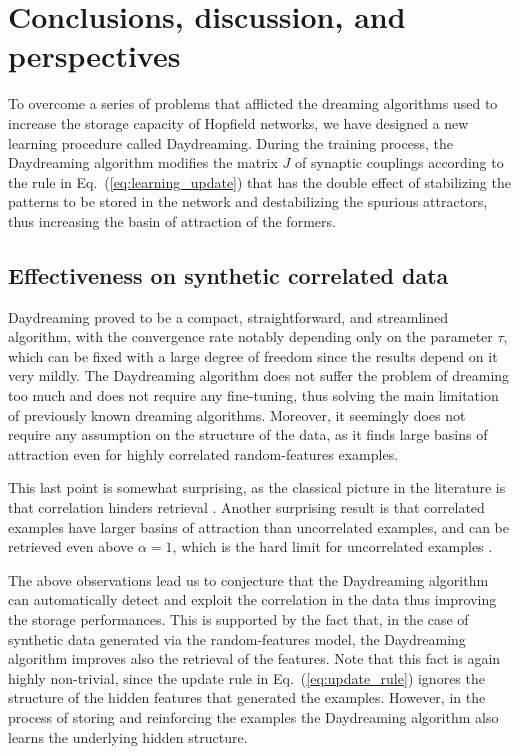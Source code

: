 \documentclass[a4paper]{cas-sc}
\begin{document}
\section{Conclusions, discussion, and perspectives}
\label{sec:conclusions}
To overcome a series of problems that afflicted the dreaming algorithms used to increase the storage capacity of Hopfield networks, we have designed a new learning procedure called Daydreaming.
During the training process, the Daydreaming algorithm modifies the matrix $J$ of synaptic couplings according to the rule in Eq.~(\ref{eq:learning_update}) that has the double effect of stabilizing the patterns to be stored in the network and destabilizing the spurious attractors, thus increasing the basin of attraction of the formers.  

\subsection{Effectiveness on synthetic correlated data}
Daydreaming proved to be a compact, straightforward, and streamlined algorithm, with the convergence rate notably depending only on the parameter $\tau$, which can be fixed with a large degree of freedom since the results depend on it very mildly. The Daydreaming algorithm does not suffer the problem of dreaming too much and does not require any fine-tuning, thus solving the main limitation of previously known dreaming algorithms. Moreover, it seemingly does not require any assumption on the structure of the data, as it finds large basins of attraction even for highly correlated random-features examples. 

This last point is somewhat surprising, as the classical picture in the literature is that correlation hinders retrieval \cite{amit1987information, fontanari1990storage, der1992modified, lowe1998storage, van1997hebbian}. Another surprising result is that correlated examples have larger basins of attraction than uncorrelated examples, and can be retrieved even above $\alpha=1$, which is the hard limit for uncorrelated examples \cite{gardner1988space}. 

The above observations lead us to conjecture that the Daydreaming algorithm can automatically detect and exploit the correlation in the data thus improving the storage performances.
This is supported by the fact that, in the case of synthetic data generated via the random-features model, the Daydreaming algorithm improves also the retrieval of the features.
Note that this fact is again highly non-trivial, since the update rule in Eq.~(\ref{eq:update_rule}) ignores the structure of the hidden features that generated the examples.
However, in the process of storing and reinforcing the examples the Daydreaming algorithm also learns the underlying hidden structure.
\end{document}
